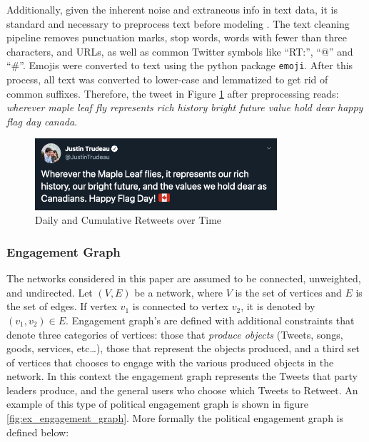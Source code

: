 \documentclass{nws}
\begin{document}
Additionally, given the inherent noise and extraneous info in text data, it is
standard and necessary to preprocess text before modeling
\cite{sapul2017trending}. The text cleaning pipeline removes punctuation marks,
stop words, words with fewer than three characters, and URLs, as well as common
Twitter symbols like ``RT:'', ``@'' and ``\#''. Emojis were converted to text
using the python package \texttt{emoji}. After this process, all text was
converted to lower-case and lemmatized to get rid of common suffixes. Therefore,
the tweet in Figure \ref{fig:tweet_ex} after preprocessing reads: \emph{wherever
maple leaf fly represents rich history bright future value hold dear happy flag
day canada}.

\begin{figure}[h!]
  \centering
  \includegraphics[width=0.8\textwidth]{figures/tweet_ex}
  \caption[Daily and Cumulative Retweets over Time]{Daily and Cumulative Retweets over Time}
  \label{fig:tweet_ex}
\end{figure}

\subsubsection{Engagement Graph}

The networks considered in this paper are assumed to be connected, unweighted,
and undirected. Let $(V,E)$ be a network, where $V$ is the set of vertices and
$E$ is the set of edges. If vertex $v_1$ is connected to vertex $v_2$, it is
denoted by $(v_1,v_2)\in E$. Engagement graph's are defined with additional
constraints that denote three categories of vertices: those that \emph{produce
objects} (Tweets, songs, goods, services, etc\dots), those that represent the
objects produced, and a third set of vertices that chooses to engage with the
various produced objects in the network. In this context the engagement graph
represents the Tweets that party leaders produce, and the general users who
choose which Tweets to Retweet. An example of this type of political engagement
graph is shown in figure \ref{fig:ex_engagement_graph}. More formally the
political engagement graph is defined below:
\end{document}
